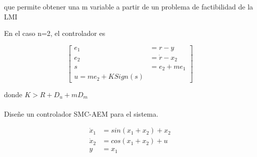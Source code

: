  que permite obtener una m variable a partir de un problema de factibilidad de la LMI

 En el caso n=2, el controlador es

 
 \begin{equation*}
    \begin{bmatrix}
        e_1&=r-y\\
        e_2&=\dot{r}-x_2\\
        s&=e_2+me_1\\
        u=me_2+KSign(s)
    \end{bmatrix}
 \end{equation*}

 donde \(K>R+D_u+mD_m\)

 \paragraph{} Diseñe un controlador SMC-AEM para el sistema.

 \begin{equation*}
    \begin{aligned}
        \dot{x}_1&=sin(x_1+x_2)+x_2\\
        \dot{x}_2&=cos(x_1+x_2)+u\\
        y&=x_1
    \end{aligned}
 \end{equation*}

